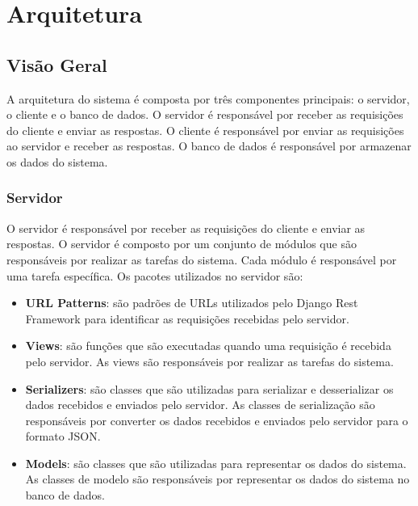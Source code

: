 \chapter[Arquitetura]{Arquitetura}

\section{Visão Geral}

A arquitetura do sistema é composta por três componentes principais: o servidor, o cliente e o banco de dados. O servidor é responsável por receber as requisições do cliente e enviar as respostas. O cliente é responsável por enviar as requisições ao servidor e receber as respostas. O banco de dados é responsável por armazenar os dados do sistema.

\subsection{Servidor}

O servidor é responsável por receber as requisições do cliente e enviar as respostas. O servidor é composto por um conjunto de módulos que são responsáveis por realizar as tarefas do sistema. Cada módulo é responsável por uma tarefa específica. Os pacotes utilizados no servidor são:

\begin{itemize}
    \item \textbf{URL Patterns}: são padrões de URLs utilizados pelo Django Rest Framework para identificar as requisições recebidas pelo servidor.
    \item \textbf{Views}: são funções que são executadas quando uma requisição é recebida pelo servidor. As views são responsáveis por realizar as tarefas do sistema.
    \item \textbf{Serializers}: são classes que são utilizadas para serializar e desserializar os dados recebidos e enviados pelo servidor. As classes de serialização são responsáveis por converter os dados recebidos e enviados pelo servidor para o formato JSON.
    \item \textbf{Models}: são classes que são utilizadas para representar os dados do sistema. As classes de modelo são responsáveis por representar os dados do sistema no banco de dados.
\end{itemize}

